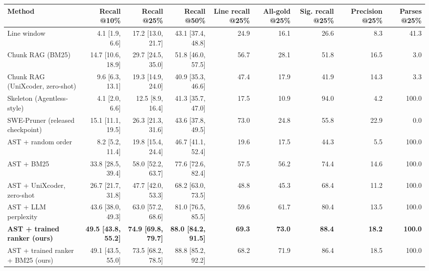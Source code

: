\begin{tabular}{lrrrrrrrr}
\toprule
Method & Recall @10\% & Recall @25\% & Recall @50\% & Line recall @25\% & All-gold @25\% & Sig. recall @25\% & Precision @25\% & Parses @25\% \\
\midrule
Line window & 4.1 [1.9, 6.6] & 17.2 [13.0, 21.7] & 43.1 [37.4, 48.8] & 24.9 & 16.1 & 26.6 & 8.3 & 41.3 \\
Chunk RAG (BM25) & 14.7 [10.6, 18.9] & 29.7 [24.5, 35.0] & 51.8 [46.0, 57.5] & 56.7 & 28.1 & 51.8 & 16.5 & 3.0 \\
Chunk RAG (UniXcoder, zero-shot) & 9.6 [6.3, 13.1] & 19.3 [14.9, 24.0] & 40.9 [35.3, 46.6] & 47.4 & 17.9 & 41.9 & 14.3 & 3.3 \\
Skeleton (Agentless-style) & 4.1 [2.0, 6.6] & 12.5 [8.9, 16.4] & 41.3 [35.7, 47.0] & 17.5 & 10.9 & 94.0 & 4.2 & 100.0 \\
SWE-Pruner (released checkpoint) & 15.1 [11.1, 19.5] & 26.3 [21.3, 31.6] & 43.6 [37.8, 49.5] & 73.0 & 24.8 & 55.8 & 22.9 & 0.0 \\
AST + random order & 8.2 [5.2, 11.4] & 19.8 [15.4, 24.4] & 46.7 [41.1, 52.4] & 19.6 & 17.5 & 44.3 & 5.5 & 100.0 \\
AST + BM25 & 33.8 [28.5, 39.4] & 58.0 [52.2, 63.7] & 77.6 [72.6, 82.4] & 57.5 & 56.2 & 74.4 & 14.6 & 100.0 \\
AST + UniXcoder, zero-shot & 26.7 [21.7, 31.8] & 47.7 [42.0, 53.3] & 68.2 [63.0, 73.5] & 48.8 & 45.3 & 68.4 & 11.2 & 100.0 \\
AST + LLM perplexity & 43.6 [38.0, 49.3] & 63.0 [57.2, 68.6] & 81.0 [76.5, 85.5] & 59.6 & 61.7 & 80.4 & 13.5 & 100.0 \\
\textbf{AST + trained ranker (ours)} & \textbf{49.5 [43.8, 55.2]} & \textbf{74.9 [69.8, 79.7]} & \textbf{88.0 [84.2, 91.5]} & \textbf{69.3} & \textbf{73.0} & \textbf{88.4} & \textbf{18.2} & \textbf{100.0} \\
AST + trained ranker + BM25 (ours) & 49.1 [43.5, 55.0] & 73.5 [68.2, 78.5] & 88.8 [85.2, 92.2] & 68.2 & 71.9 & 86.4 & 18.5 & 100.0 \\
\bottomrule
\end{tabular}
